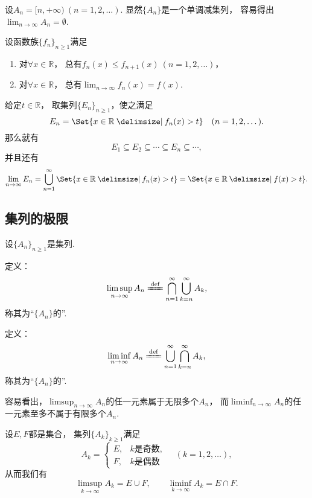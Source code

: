 \begin{example}
设\(A_n = [n,+\infty)\ (n=1,2,\dotsc)\).
显然\(\{A_n\}\)是一个单调减集列，
容易得出\(\lim_{n\to\infty} A_n = \emptyset\).
\end{example}

\begin{example}
设函数族\(\{f_n\}_{n\geq1}\)满足
\begin{enumerate}
	\item 对\(\forall x\in\mathbb{R}\)，
	总有\(f_n(x) \leq f_{n+1}(x)\ (n=1,2,\dotsc)\)，
	\item 对\(\forall x\in\mathbb{R}\)，
	总有\(\lim_{n\to\infty} f_n(x) = f(x)\).
\end{enumerate}
给定\(t\in\mathbb{R}\)，
取集列\(\{E_n\}_{n\geq1}\)，使之满足\[
	E_n = \Set{ x\in\mathbb{R} \given f_n(x) > t }
	\quad(n=1,2,\dotsc).
\]
那么就有\[
	E_1 \subseteq E_2 \subseteq \dotsb \subseteq E_n \subseteq \dotsb,
\]
并且还有\[
	\lim_{n\to\infty} E_n
	= \bigcup_{n=1}^\infty \Set{ x\in\mathbb{R} \given f_n(x) > t }
	= \Set{ x\in\mathbb{R} \given f(x) > t }.
\]
\end{example}

\subsection{集列的极限}
\begin{definition}
设\(\{A_n\}_{n\geq1}\)是集列.

定义：\[
	\limsup_{n\to\infty} A_n
	\defeq
	\bigcap_{n=1}^\infty
	\bigcup_{k=n}^\infty
	A_k,
\]
称其为“\(\{A_n\}\)的”.

定义：\[
	\liminf_{n\to\infty} A_n
	\defeq
	\bigcup_{n=1}^\infty
	\bigcap_{k=n}^\infty
	A_k,
\]
称其为“\(\{A_n\}\)的”.
\end{definition}
容易看出，\(\limsup_{n\to\infty} A_n\)的任一元素属于无限多个\(A_n\)，
而\(\liminf_{n\to\infty} A_n\)的任一元素至多不属于有限多个\(A_n\).

\begin{example}
设\(E,F\)都是集合，
集列\(\{A_k\}_{k\geq1}\)满足\[
	A_k = \left\{ \begin{array}{cl}
		E, & \text{$k$是奇数}, \\
		F, & \text{$k$是偶数}
	\end{array} \right.
	\quad(k=1,2,\dotsc),
\]
从而我们有\[
	\limsup_{k\to\infty} A_k
	= E \cup F, \qquad
	\liminf_{k\to\infty} A_k
	= E \cap F.
\]
\end{example}


